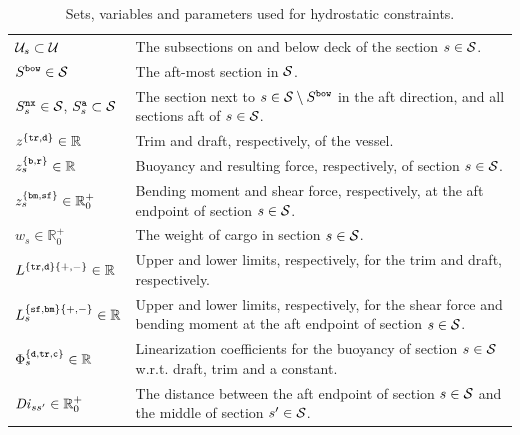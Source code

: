 \begin{table}[width=.9\linewidth,cols=2,pos=h]
\caption{Sets, variables and parameters used for hydrostatic constraints.}\label{tab:hydro}
\begin{tabular*}{\tblwidth}{@{} Lp{12cm} @{}}
\toprule
$\mathcal{U}_s\subset\mathcal{U}$								& The subsections on and below deck of the section $s\in\mathcal{S}$.\\
$S^\texttt{bow}\in\mathcal{S}$								& The aft-most section in $\mathcal{S}$.\\
$S^\texttt{nx}_s\in\mathcal{S}$, $S^\texttt{a}_s\subset\mathcal{S}$	& The section next to $s\in\mathcal{S}\setminus S^\texttt{bow}$ in the aft direction, and all sections aft of $s\in\mathcal{S}$.\\
\midrule
$z^{\{\texttt{tr},\texttt{d}\}}\in\mathbb{R}$ 			& Trim and draft, respectively, of the vessel.\\
$z^{\{\texttt{b},\texttt{r}\}}_{s}\in \mathbb{R}$			& Buoyancy and resulting force, respectively, of section $s\in\mathcal{S}$.\\
$z^{\{\texttt{bm},\texttt{sf}\}}_{s}\in \mathbb{R}^+_0$	& Bending moment and shear force, respectively, at the aft endpoint of section $s\in\mathcal{S}$.\\
$w_{s} \in\mathbb{R}^+_0$							& The weight of cargo in section $s\in\mathcal{S}$.\\
\midrule
$L^{\{\texttt{tr},\texttt{d}\}\{+,-\}}\in\mathbb{R}$			& Upper and lower limits, respectively, for the trim and draft, respectively.\\
$L^{\{\texttt{sf},\texttt{bm}\}\{+,-\}}_{s}\in\mathbb{R}$		& Upper and lower limits, respectively, for the shear force and bending moment at the aft endpoint of section $s\in\mathcal{S}$.\\
$\Phi^{\{\texttt{d},\texttt{tr},\texttt{c}\}}_{s}\in\mathbb{R}$	& Linearization coefficients for the buoyancy of section $s\in \mathcal{S}$ w.r.t. draft, trim and a constant.\\
$\mathit{Di}_{ss'}\in \mathbb{R}^+_0$						& The distance between the aft endpoint of section $s\in\mathcal{S}$ and the middle of section $s'\in\mathcal{S}$.\\
\bottomrule
\end{tabular*}
\end{table}

